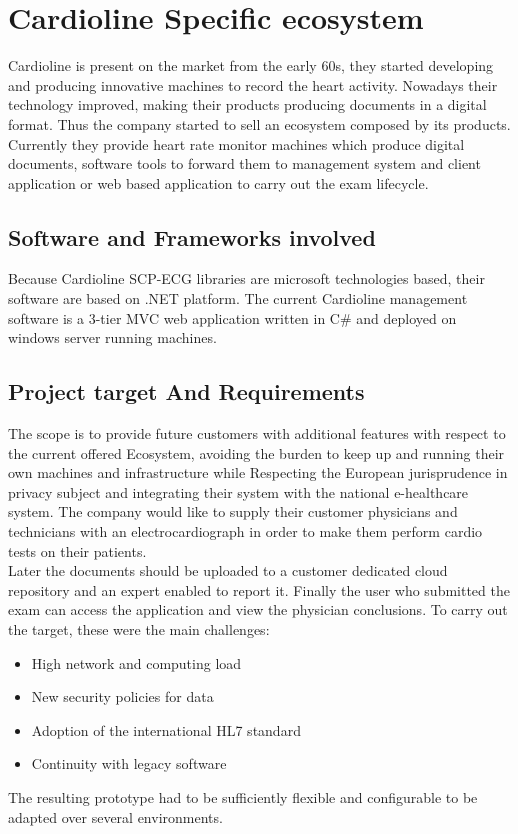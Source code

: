 \chapter{Cardioline Specific ecosystem}
\label{chapter:cardioline_specific_ecosystem}
Cardioline is present on the market from the early 60s, they started developing and producing innovative machines to record the heart activity. Nowadays their technology improved, making their products producing documents in a digital format.
Thus the company started to sell an ecosystem composed by its products. Currently they provide heart rate monitor machines which produce digital documents, software tools to forward them to management system and client application or web based application to carry out the exam lifecycle.

\section{Software and Frameworks involved}
Because Cardioline SCP-ECG libraries are microsoft technologies based, their software are based on .NET platform.
The current Cardioline management software is a 3-tier MVC web application written in C\# and deployed on windows server running machines.

\section{Project target And Requirements}
The scope is to provide future customers with additional features with respect to the current offered Ecosystem, avoiding the burden to keep up and running their own machines and infrastructure while Respecting the European jurisprudence in privacy subject and integrating their system with the national e-healthcare system. The company would like to supply their customer physicians and technicians with an electrocardiograph in order to make them perform cardio tests on their patients.\\
Later the documents should be uploaded to a customer dedicated cloud repository and an expert enabled to report it. Finally the user who submitted the exam can access the application and view the physician conclusions.
To carry out the target, these were the main challenges:
\begin{itemize}
    \item High network and computing load
    \item New security policies for data
    \item Adoption of the international HL7 standard
    \item Continuity with legacy software
\end{itemize}
The resulting prototype had to be sufficiently flexible and configurable to be adapted over several environments.

